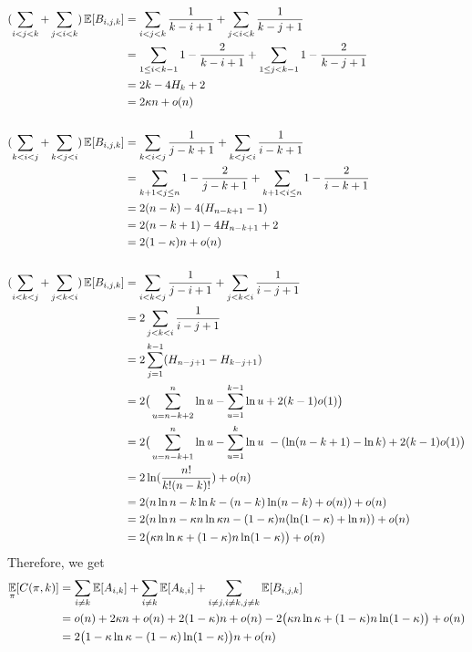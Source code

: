 \documentclass[11pt,a4paper,oneside]{article}
\newcommand{\E}{\mathop{\mathbb{E\/}}}
\begin{document}
\begin{problem}{9}
	\[
		\begin{split}
            (\sum_{i < j < k} + \sum_{j < i < k})\E[B_{i, j, k}] &= \sum_{i < j < k}\frac{1}{k - i + 1} + \sum_{j < i < k}\frac{1}{k - j + 1}\\
            &= \sum_{1 \leq i < k - 1}1 - \frac{2}{k - i + 1} + \sum_{1 \leq j < k - 1} 1 - \frac{2}{k - j + 1}\\
			&= 2k - 4H_k + 2 \\
			&= 2\kappa n + o(n)\\\\
            (\sum_{k < i < j} + \sum_{k < j < i})\E[B_{i, j, k}] &= \sum_{k < i < j}\frac{1}{j - k + 1} + \sum_{k < j < i}\frac{1}{i - k + 1}\\
            &= \sum_{k + 1 < j \leq n}1 - \frac{2}{j - k + 1} + \sum_{k + 1 < i \leq n} 1 - \frac{2}{i - k + 1}\\
            &= 2(n - k) - 4(H_{n - k + 1} - 1)\\
            &= 2(n - k + 1) - 4H_{n - k + 1} + 2\\
            &= 2(1 - \kappa) n + o(n)\\\\
			(\sum_{i < k < j} + \sum_{j < k < i}) \E[B_{i, j, k}]
			&= \sum_{i < k < j}\frac{1}{j - i + 1} + \sum_{j < k < i}\frac{1}{i - j + 1} \\
			&= 2\sum_{j < k < i}\frac{1}{i - j + 1} \\
			&= 2\sum_{j = 1} ^ {k - 1} (H_{n - j + 1} - H_{k - j + 1}) \\
			&= 2\big(\sum_{u = n - k + 2} ^ n \ln u - \sum_{u = 1} ^ {k - 1} \ln u + 2(k - 1)o(1)\big) \\
			&= 2\big(\sum_{u = n - k + 1} ^ n \ln u - \sum_{u = 1} ^ {k} \ln u  \ - (\ln (n - k + 1) - \ln {k}) +2(k - 1)o(1)\big)\\
			&= 2\ln (\frac {n!} {k! (n - k)!}) + o(n)\\ 
			&= 2(n \ln n - k \ln k - (n - k) \ln (n - k) + o(n)) + o(n)\\
			&= 2(n \ln n - \kappa n \ln \kappa n - (1 - \kappa)n (\ln (1 - \kappa) + \ln n)) + o(n)\\
            &= 2\big(\kappa n \ln \kappa + (1 - \kappa) n \ln(1 - \kappa)\big) + o(n) 
		\end{split}
	\]
	Therefore, we get
	\[
		\begin{split}
\E_{\pi} [C(\pi,k)] &= \sum_{i \not= k}\E[A_{i, k}] + \sum_{i \not= k}\E[A_{k, i}] + \sum_{i \not= j, i \not= k,j \not= k}\E[B_{i, j, k}] \\
 &= o(n) + 2\kappa n + o(n) + 2(1 - \kappa) n + o(n) -  2\big(\kappa n \ln \kappa + (1 - \kappa) n \ln(1 - \kappa)\big) + o(n)\\
            &= 2 \big( 1 - \kappa  \ln \kappa - (1 - \kappa)  \ln(1 - \kappa)\big) n+ o(n)
        \end{split}
    \]
\end{problem}
\end{document}
